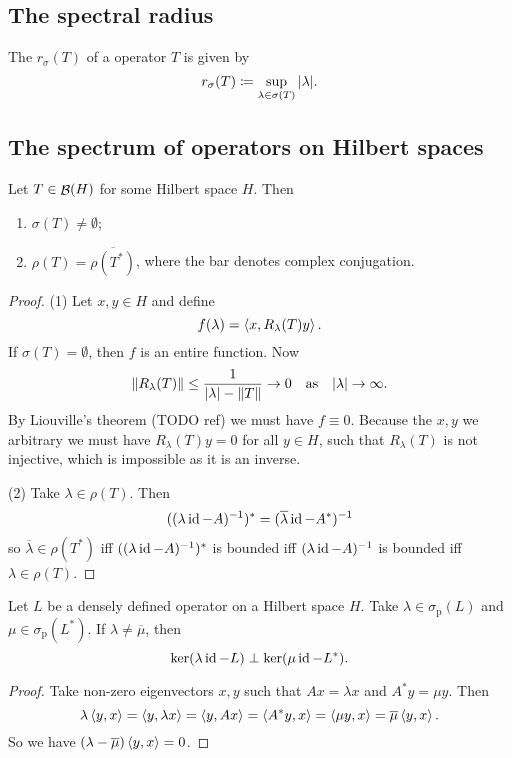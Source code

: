 \subsection{The spectral radius}
\begin{definition}
The  $r_\sigma(T)$ of a operator $T$ is given by
\[ r_\sigma(T) \coloneqq \sup_{\lambda\in\sigma(T)}|\lambda|. \]
\end{definition}


\subsection{The spectrum of operators on Hilbert spaces}
\begin{proposition}
Let $T \in \mathop{\mathcal{B}}(H)$ for some Hilbert space $H$. Then
\begin{enumerate}
\item $\sigma(T) \neq \emptyset$;
\item $\rho(T) = \overline{\rho(T^*)}$, where the bar denotes complex conjugation.
\end{enumerate}
\end{proposition}
\begin{proof}
(1) Let $x,y\in H$ and define
\[ f(\lambda) = \left\langle x,R_\lambda(T)y \right\rangle. \]
If $\sigma(T) = \emptyset$, then $f$ is an entire function. Now
\[ \lVert R_\lambda(T)\rVert \leq \frac{1}{|\lambda| - \lVert T\rVert} \to 0 \quad\text{as}\quad |\lambda| \to \infty. \]
By Liouville's theorem (TODO ref) we must have $f\equiv 0$. Because the $x,y$ we arbitrary we must have $R_\lambda(T)y = 0$ for all $y\in H$, such that $R_\lambda(T)$ is not injective, which is impossible as it is an inverse.

(2) Take $\lambda\in\rho(T)$. Then
\[ ((\lambda\operatorname{id} - A)^{-1})^* = (\overline{\lambda}\operatorname{id} - A^*)^{-1} \]
so $\overline{\lambda}\in\rho(T^*)$ iff $((\lambda\operatorname{id} - A)^{-1})^*$ is bounded iff $(\lambda\operatorname{id} - A)^{-1}$ is bounded iff $\lambda\in \rho(T)$.
\end{proof}

\begin{lemma} \label{lemma:eigenspaceOrthogonalAdjoint}
Let $L$ be a densely defined operator on a Hilbert space $H$. Take $\lambda\in \sigma_\text{p}(L)$ and $\mu\in\sigma_\text{p}(L^*)$. If $\lambda \neq \overline{\mu}$, then
\[ \ker(\lambda\operatorname{id} - L)\perp \ker(\mu\operatorname{id} - L^*). \]
\end{lemma}
\begin{proof}
Take non-zero eigenvectors $x,y$ such that $Ax = \lambda x$ and $A^*y = \mu y$. Then
\[ \lambda \left\langle y,x \right\rangle = \left\langle y,\lambda x \right\rangle = \left\langle y, Ax \right\rangle = \left\langle A^*y,x \right\rangle = \left\langle \mu y,x \right\rangle = \overline{\mu}\left\langle y,x \right\rangle. \]
So we have $(\lambda - \overline{\mu})\left\langle y,x \right\rangle = 0$.
\end{proof}

